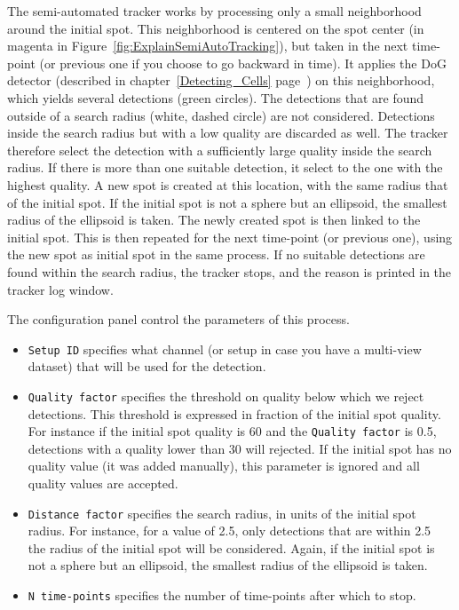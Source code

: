 The semi-automated tracker works by processing only a small neighborhood around the initial spot.
This neighborhood is centered on the spot center (in magenta in Figure~\ref{fig:ExplainSemiAutoTracking}), but taken in the next time-point (or previous one if you choose to go backward in time).
It applies the DoG detector (described in chapter~\ref{Detecting_Cells} page~\pageref{Detection_Cells_DoG_Detector}) on this neighborhood, which yields several detections (green circles).
The detections that are found outside of a search radius (white, dashed circle) are not considered.
Detections inside the search radius but with a low quality are discarded as well.
The tracker therefore select the detection with a sufficiently large quality inside the search radius. 
If there is more than one suitable detection, it select to the one with the highest quality.
A new spot is created at this location, with the same radius that of the initial spot. 
If the initial spot is not a sphere but an ellipsoid, the smallest radius of the ellipsoid is taken. 
The newly created spot is then linked to the initial spot. 
This is then repeated for the next time-point (or previous one), using the new spot as initial spot in the same process.
If no suitable detections are found within the search radius, the tracker stops, and the reason is printed in the tracker log window.

The configuration panel control the parameters of this process.
\begin{itemize}
    
    \item \texttt{Setup ID} specifies what channel (or setup in case you have a multi-view dataset) that will be used for the detection.
    
    \item \texttt{Quality factor} specifies the threshold on quality below which we reject detections. This threshold is expressed in fraction of the initial spot quality. For instance if the initial spot quality is 60 and the \texttt{Quality factor} is 0.5, detections with a quality lower than 30 will rejected. If the initial spot has no quality value (it was added manually), this parameter is ignored and all quality values are accepted.
    
    \item \texttt{Distance factor} specifies the search radius, in units of the initial spot radius. For instance, for a value of 2.5, only detections that are within 2.5 \texttimes\, the radius of the initial spot will be considered. Again, if the initial spot is not a sphere but an ellipsoid, the smallest radius of the ellipsoid is taken. 
    
    \item \texttt{N time-points} specifies the number of time-points after which to stop.
    
\end{itemize}

